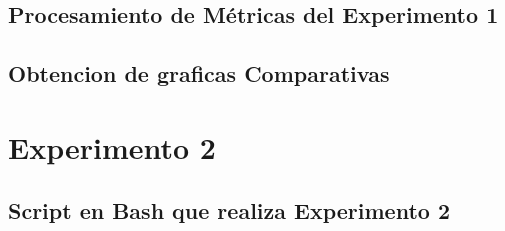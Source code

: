     
    
 \subsection*{Procesamiento de Métricas del Experimento 1}
     
     
     
     
     
     
 \subsection{Obtencion de graficas Comparativas}
     
     
\section{Experimento 2}

 \subsection*{Script en Bash que realiza Experimento 2}

     

